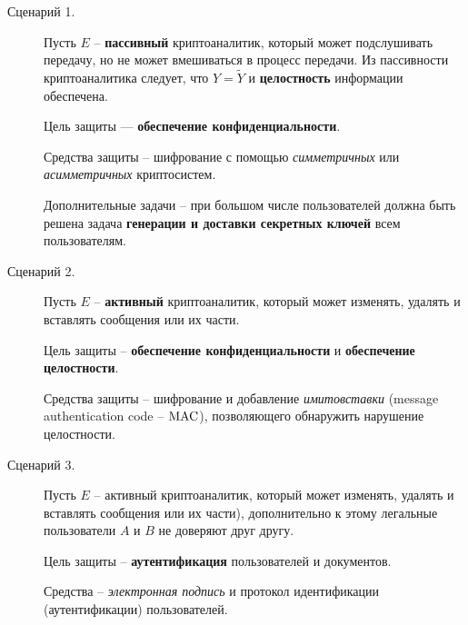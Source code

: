\begin{description}
    \item[Сценарий 1.] Пусть $E$ -- \textbf{пассивный} криптоаналитик, который может подслушивать передачу, но не может вмешиваться в процесс передачи. Из пассивности криптоаналитика следует, что $Y = \widetilde{Y}$ и \textbf{целостность} информации обеспечена.

Цель защиты --- \textbf{обеспечение конфиденциальности}.

Средства защиты -- шифрование с помощью \emph{симметричных} или \emph{асимметричных } криптосистем.

Дополнительные задачи -- при большом числе пользователей должна быть решена задача \textbf{генерации и доставки секретных ключей} всем пользователям.

    \item[Сценарий 2.] Пусть $E$ -- \textbf{активный} криптоаналитик, который может изменять, удалять и вставлять сообщения или их части.

    Цель защиты -- \textbf{обеспечение конфиденциальности} и  \textbf{обеспечение целостности}.

Средства защиты --  шифрование и добавление \emph{имитовставки} (message authentication code -- $\textrm{MAC}$), позволяющего обнаружить нарушение целостности.

    \item[Сценарий 3.] Пусть $E$ -- активный криптоаналитик, который может изменять, удалять и вставлять сообщения или их части), дополнительно к этому легальные пользователи $A$ и $B$ не доверяют друг другу.

Цель защиты -- \textbf{аутентификация }пользователей и документов.

Средства -- \emph{электронная подпись} и протокол идентификации (аутентификации) пользователей.
\end{description}

%
